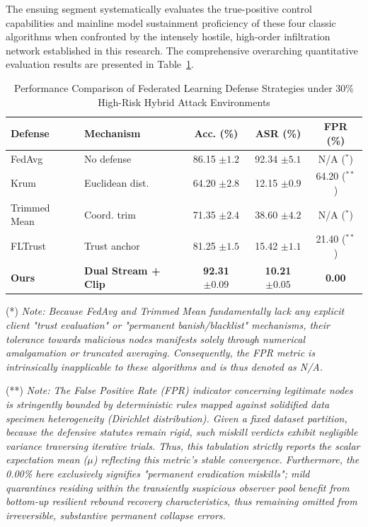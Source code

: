 \documentclass[runningheads]{llncs}
\begin{document}
The ensuing segment systematically evaluates the true-positive control capabilities and mainline model sustainment proficiency of these four classic algorithms when confronted by the intensely hostile, high-order infiltration network established in this research. The comprehensive overarching quantitative evaluation results are presented in Table~\ref{tab:baseline}.

\begin{table}[htbp]
\centering
\begin{threeparttable}
\caption{Performance Comparison of Federated Learning Defense Strategies under 30\% High-Risk Hybrid Attack Environments}
\vspace{4pt}
\label{tab:baseline}
\footnotesize
\begin{tabular}{l l c c c}
\toprule
\textbf{Defense} & \textbf{Mechanism} & \textbf{Acc. (\%)} & \textbf{ASR (\%)} & \textbf{FPR (\%)} \\
\midrule
FedAvg \cite{mcmahan2017fedavg} & No defense & 86.15 $\pm 1.2$ & 92.34 $\pm 5.1$ & N/A ($^*$) \\
Krum \cite{blanchard2017krum} & Euclidean dist. & 64.20 $\pm 2.8$ & 12.15 $\pm 0.9$ & 64.20 ($^{**}$) \\
Trimmed Mean \cite{yin2018byzantine}& Coord. trim & 71.35 $\pm 2.4$ & 38.60 $\pm 4.2$ & N/A ($^*$) \\
FLTrust \cite{cao2021fltrust} & Trust anchor & 81.25 $\pm 1.5$ & 15.42 $\pm 1.1$ & 21.40 ($^{**}$) \\
\textbf{Ours} & \textbf{Dual Stream + Clip} & \textbf{92.31 $\pm 0.09$} & \textbf{10.21 $\pm 0.05$} & \textbf{0.00} \\
\bottomrule
\end{tabular}
\begin{tablenotes}
\small
\item (*) \textit{Note: Because FedAvg and Trimmed Mean fundamentally lack any explicit client "trust evaluation" or "permanent banish/blacklist" mechanisms, their tolerance towards malicious nodes manifests solely through numerical amalgamation or truncated averaging. Consequently, the FPR metric is intrinsically inapplicable to these algorithms and is thus denoted as N/A.}
\item (**) \textit{Note: The False Positive Rate (FPR) indicator concerning legitimate nodes is stringently bounded by deterministic rules mapped against solidified data specimen heterogeneity (Dirichlet distribution). Given a fixed dataset partition, because the defensive statutes remain rigid, such miskill verdicts exhibit negligible variance traversing iterative trials. Thus, this tabulation strictly reports the scalar expectation mean ($\mu$) reflecting this metric's stable convergence. Furthermore, the 0.00\% here exclusively signifies "permanent eradication miskills"; mild quarantines residing within the transiently suspicious observer pool benefit from bottom-up resilient rebound recovery characteristics, thus remaining omitted from irreversible, substantive permanent collapse errors.}
\end{tablenotes}
\end{threeparttable}
\end{table}
\end{document}
